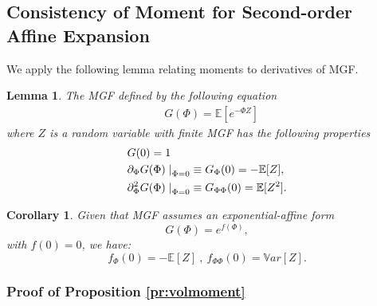 \documentclass[pdftex,11pt,a4paper] {article}
\newtheorem{corollary}{Corollary}[section]
\newtheorem{lemma}{Lemma}[section]
\begin{document}
\subsection{Consistency of Moment for Second-order Affine Expansion}

We apply the following lemma relating moments to derivatives of MGF. 
\begin{lemma} \label {lemma:g}
The MGF defined by the following equation
\begin{equation} \label {eq:mmg1}
\begin{split}
& G(\Phi) = \mathbb{E}[e^{-\Phi Z }]
\end{split}
\end{equation}
where $Z$ is a random variable with finite MGF has the following properties
  \begin{equation} \label {eq:mmg2}
\begin{split}
& G(0) = 1\\
& \partial_{\Phi} G(\Phi) \left.\right|_{\Phi=0} \equiv G_{\Phi}(0)= -\mathbb{E}[Z],\\
& \partial^{2}_{\Phi} G(\Phi) \left.\right|_{\Phi=0} \equiv  G_{\Phi\Phi}(0)= \mathbb{E}[Z^{2}].\vspace*{-1.0\baselineskip}
\end{split}
\end{equation}
\end{lemma}

\begin{corollary}
Given that MGF assumes an exponential-affine form
\begin{equation} \label {eq:mmg3}
G(\Phi) = e^{f(\Phi)},
\end{equation}
with $f(0)=0$, we have:
\begin{equation} \label {eq:mmg4}
f_{\Phi}(0)= -\mathbb{E}[Z] \ , \  f_{\Phi\Phi}(0)= \mathbb{V}ar[Z].
\end{equation}
\end{corollary}


\subsubsection{Proof of Proposition \ref{pr:volmoment}}\label{app:volmoment}
\end{document}
